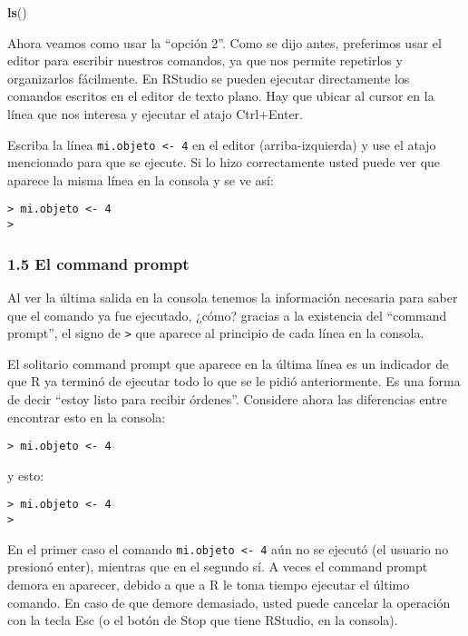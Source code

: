 \documentclass[]{article}
\newenvironment{Shaded}{}{}
\newcommand{\KeywordTok}[1]{\textcolor[rgb]{0.00,0.44,0.13}{\textbf{{#1}}}}
\newcommand{\NormalTok}[1]{{#1}}
\begin{document}
\begin{Shaded}
\begin{Highlighting}[]
\KeywordTok{ls}\NormalTok{()}
\end{Highlighting}
\end{Shaded}
Ahora veamos como usar la ``opción 2''. Como se dijo antes, preferimos
usar el editor para escribir nuestros comandos, ya que nos permite
repetirlos y organizarlos fácilmente. En RStudio se pueden ejecutar
directamente los comandos escritos en el editor de texto plano. Hay que
ubicar al cursor en la línea que nos interesa y ejecutar el atajo
Ctrl+Enter.

Escriba la línea \texttt{mi.objeto \textless{}- 4} en el editor
(arriba-izquierda) y use el atajo mencionado para que se ejecute. Si lo
hizo correctamente usted puede ver que aparece la misma línea en la
consola y se ve así:

\begin{verbatim}
> mi.objeto <- 4
>
\end{verbatim}
\subsubsection{1.5 El command prompt}

Al ver la última salida en la consola tenemos la información necesaria
para saber que el comando ya fue ejecutado, ¿cómo? gracias a la
existencia del ``command prompt'', el signo de \texttt{\textgreater{}}
que aparece al principio de cada línea en la consola.

El solitario command prompt que aparece en la última línea es un
indicador de que R ya terminó de ejecutar todo lo que se le pidió
anteriormente. Es una forma de decir ``estoy listo para recibir
órdenes''. Considere ahora las diferencias entre encontrar esto en la
consola:

\begin{verbatim}
> mi.objeto <- 4
\end{verbatim}
y esto:

\begin{verbatim}
> mi.objeto <- 4
>
\end{verbatim}
En el primer caso el comando \texttt{mi.objeto \textless{}- 4} aún no se
ejecutó (el usuario no presionó enter), mientras que en el segundo sí. A
veces el command prompt demora en aparecer, debido a que a R le toma
tiempo ejecutar el último comando. En caso de que demore demasiado,
usted puede cancelar la operación con la tecla Esc (o el botón de Stop
que tiene RStudio, en la consola).
\end{document}
